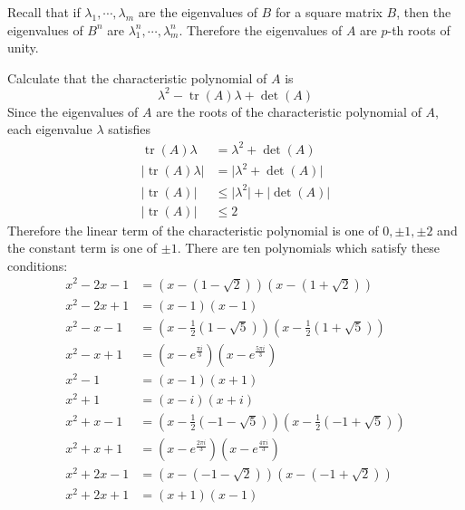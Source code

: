 \documentclass{amsart}
\DeclareMathOperator{\tr}{tr}
\begin{document}
Recall that if $\lambda_1, \cdots, \lambda_m$ are the eigenvalues of $B$ for a square matrix $B$, then the eigenvalues of $B^n$ are $\lambda_1^n, \cdots, \lambda_m^n$.
Therefore the eigenvalues of $A$ are $p$-th roots of unity.

Calculate that the characteristic polynomial of $A$ is
\[ \lambda^2 - \tr(A) \lambda + \det(A) \]
Since the eigenvalues of $A$ are the roots of the characteristic polynomial of $A$, each eigenvalue $\lambda$ satisfies
\begin{align*}
\tr(A) \lambda &= \lambda^2 + \det(A) \\
\lvert \tr(A) \lambda \rvert &= \lvert \lambda^2 + \det(A) \rvert \\
\lvert \tr(A) \rvert &\leq \lvert \lambda^2 \rvert + \lvert \det(A) \rvert \\
\lvert \tr(A) \rvert &\leq 2
\end{align*}
Therefore the linear term of the characteristic polynomial is one of $0, \pm 1, \pm 2$ and the constant term is one of $\pm 1$.
There are ten polynomials which satisfy these conditions:
\begin{align*}
x^2 - 2x - 1 &= (x - (1 - \sqrt{2}))(x - (1 + \sqrt{2})) \\
x^2 - 2x + 1 &= (x - 1)(x - 1) \\
x^2 - x - 1 &= (x - \frac{1}{2}(1 - \sqrt{5}))(x - \frac{1}{2}(1 + \sqrt{5})) \\
x^2 - x + 1 &= (x - e^\frac{\pi i}{3})(x - e^\frac{5 \pi i}{3}) \\
x^2 - 1 &= (x - 1)(x + 1) \\
x^2 + 1 &= (x - i)(x + i) \\
x^2 + x - 1 &= (x - \frac{1}{2}(-1 - \sqrt{5}))(x - \frac{1}{2}(-1 + \sqrt{5})) \\
x^2 + x + 1 &= (x - e^\frac{2 \pi i}{3})(x - e^\frac{4 \pi i}{3}) \\
x^2 + 2x - 1 &= (x - (-1 - \sqrt{2}))(x - (-1 + \sqrt{2})) \\
x^2 + 2x + 1 &= (x + 1)(x - 1)
\end{align*}

\pagebreak
\end{document}
